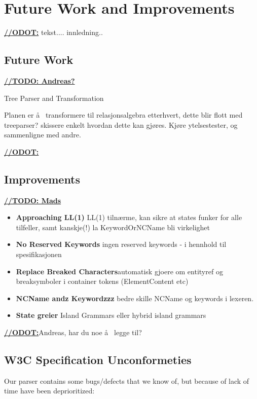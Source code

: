 \chapter{Future Work and Improvements}
\label{sect:summary:future_work}
\underline{\textbf{\LARGE //ODOT:}} tekst.... innledning..


\section{Future Work}
\underline{\textbf{\LARGE //TODO: Andreas?}}

Tree Parser and Transformation

Planen er \aa~ transformere til relasjonsalgebra etterhvert, dette blir flott med treeparser? skissere enkelt hvordan dette kan gj\o res. Kj\o re ytelsestester, og sammenligne med andre.

\underline{\textbf{\LARGE //ODOT:}}

\section{Improvements}
\label{sect:future:improvements}
\underline{\textbf{\LARGE //TODO: Mads}} 

\begin{itemize}
\item \textbf{Approaching LL(1)} LL(1) tiln\ae rme, kan sikre at states funker for alle tilfeller, samt kanskje(!) la KeywordOrNCName bli virkelighet

\item \textbf{No Reserved Keywords}  ingen reserved keywords - i hennhold til spesifikasjonen

\item \textbf{Replace Breaked Characters}automatisk gjoere om entityref og breaksymboler i container tokens (ElementContent etc)

\item \textbf{NCName andz Keywordzzz} bedre skille NCName og keywords i lexeren.

\item \textbf{State greier} Island Grammars eller hybrid island grammars

\end{itemize}

\underline{\textbf{\LARGE //ODOT:}}Andreas, har du noe \aa~ legge til?

\section{W3C Specification Unconformeties}
\label{sect:future:knownBugs}
Our parser contains some bugs/defects that we know of, but because of lack of time have been deprioritized:

